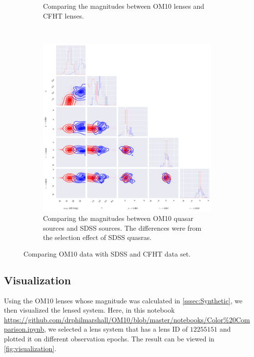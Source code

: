 \documentclass[\docopts]{\docclass}
\begin{document}
\begin{figure}
\begin{subfigure}[b]{0.3\textwidth}
        \caption{Comparing the magnitudes between OM10 lenses and CFHT lenses.}
        \label{fig:lens_cfht}
    \end{subfigure}
    ~ %
    \begin{subfigure}[b]{0.3\textwidth}
        \includegraphics[width=\textwidth]{quasar_sdss.png}
        \caption{Comparing the magnitudes between OM10 quasar sources and SDSS sources. The differences were from the selection effect of SDSS quasras.}
        \label{fig:quasar_sdss}
    \end{subfigure}
    \caption{Comparing OM10 data with SDSS and CFHT data set. }\label{fig:comparison}
\end{figure}

\subsection{Visualization}

Using the OM10 lenses whose magnitude was calculated in
\ref{sssec:Synthetic}, we then visualized the lensed system. Here, in this notebook \url{https://github.com/drphilmarshall/OM10/blob/master/notebooks/Color%20Comparison.ipynb}, we selected a lens system that has a lens ID of $12255151$ and plotted it on different observation epochs. The result can be viewed in \ref{fig:visualization}.
\end{document}
